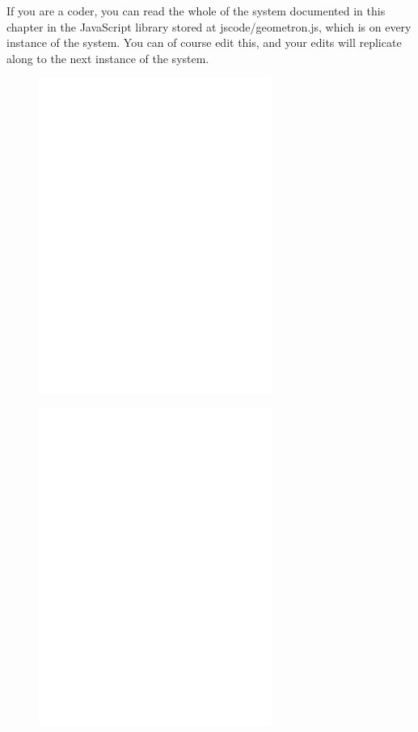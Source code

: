 If you are a coder, you can read the whole of the system documented in this chapter in the JavaScript library stored at jscode/geometron.js, which is on every instance of the system.  You can of course edit this, and your edits will replicate along to the next instance of the system.


\begin{figure}
	\centering
	\includegraphics[width=3in]{figures/shapes/blank.png}
\end{figure}
\begin{figure}
	\centering
	\includegraphics[width=3in]{figures/shapes/blank.png}
\end{figure}
